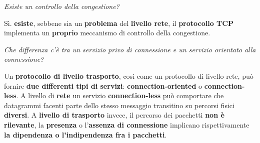 \documentclass[11pt,a4paper,oneside]{book}
\theoremstyle{definition}
\begin{document}
\begin{flushleft}
	\textit{Esiste un controllo della congestione?}
\end{flushleft}
Sì. \textbf{esiste}, sebbene sia un \textbf{problema} del \textbf{livello rete}, il \textbf{protocollo TCP} implementa un \textbf{proprio} meccanismo di controllo della congestione.

\pagebreak

\begin{flushleft}
	\textit{Che differenza c'è tra un servizio privo di connessione e un servizio orientato alla connessione?}
\end{flushleft}
Un \textbf{protocollo di livello trasporto}, cosi come un protocollo di livello rete, può fornire \textbf{due differenti tipi di servizi}: \textbf{connection-oriented} o \textbf{connection-less}. A livello di \textbf{rete} un servizio \textbf{connection-less} può comportare che datagrammi facenti parte dello stesso messaggio transitino su percorsi fisici \textbf{diversi}. A \textbf{livello di trasporto} invece, il percorso dei pacchetti \textbf{non è rilevante}, la \textbf{presenza} o l'\textbf{assenza di connessione} implicano rispettivamente \textbf{la dipendenza o l'indipendenza fra i pacchetti}.
\end{document}
